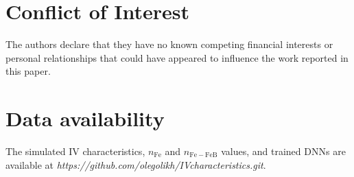 \documentclass[num-refs]{wiley-article} %
\begin{document}
\section*{Conflict of Interest}
The authors declare that they have no known competing financial interests or
personal relationships that could have appeared to influence the work reported
in this paper.

\section*{Data availability}

The simulated IV characteristics, $n_\mathrm{Fe}$ and $n_\mathrm{Fe-FeB}$ values,
and trained DNNs are available
at \newline
\emph{https://github.com/olegolikh/IVcharacteristics.git}.




%


%
\end{document}
